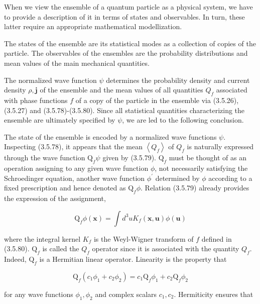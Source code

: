 \documentclass{article}
\begin{document}
When we view the ensemble of a quantum particle as a physical system, we have to provide a description of it in terms of states and observables. In turn, these latter require an appropriate mathematical modellization.

The states of the ensemble are its statistical modes as a collection of copies of the particle. The observables of the ensembles are the probability distributions and mean values of the main mechanical quantities.

The normalized wave function $\psi$ determines the probability density and current density $\rho, \boldsymbol{j}$ of the ensemble and the mean values of all quantities $Q_{f}$ associated with phase functions $f$ of a copy of the particle in the ensemble via (3.5.26), (3.5.27) and (3.5.78)-(3.5.80). Since all statistical quantities characterizing the ensemble are ultimately specified by $\psi$, we are led to the following conclusion.

The state of the ensemble is encoded by a normalized wave functions $\psi$.
Inspecting (3.5.78), it appears that the mean $\left\langle Q_{f}\right\rangle$ of $Q_{f}$ is naturally expressed through the wave function $\mathrm{Q}_{f} \psi$ given by (3.5.79). $\mathrm{Q}_{f}$ must be thought of as an operation assigning to any given wave function $\phi$, not necessarily satisfying the Schroedinger equation, another wave function $\phi^{\prime}$ determined by $\phi$ according to a fixed prescription and hence denoted as $\mathrm{Q}_{f} \phi$. Relation (3.5.79) already provides the expression of the assignment,
 
\begin{equation*}
\mathrm{Q}_{f} \phi(\boldsymbol{x})=\int d^{3} u K_{f}(\boldsymbol{x}, \boldsymbol{u}) \phi(\boldsymbol{u}) \tag{3.6.1}
\end{equation*}
 
where the integral kernel $K_{f}$ is the Weyl-Wigner transform of $f$ defined in (3.5.80). $\mathrm{Q}_{f}$ is called the $Q_{f}$ operator since it is associated with the quantity $Q_{f}$. Indeed, $\mathrm{Q}_{f}$ is a Hermitian linear operator. Linearity is the property that
 
\begin{equation*}
\mathrm{Q}_{f}\left(c_{1} \phi_{1}+c_{2} \phi_{2}\right)=c_{1} \mathrm{Q}_{f} \phi_{1}+c_{2} \mathrm{Q}_{f} \phi_{2} \tag{3.6.2}
\end{equation*}
 
for any wave functions $\phi_{1}, \phi_{2}$ and complex scalars $c_{1}, c_{2}$. Hermiticity ensures that
 
\end{document}
